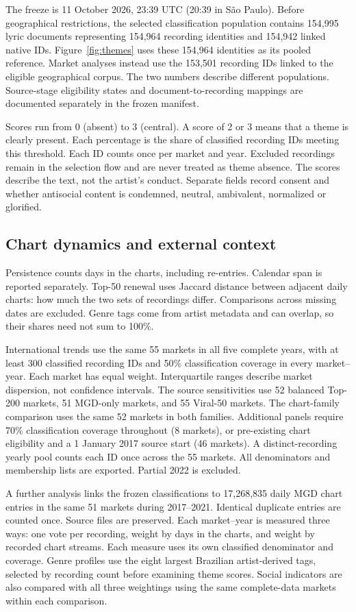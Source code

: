 \documentclass[10pt,a4paper,twocolumn]{article}
\begin{document}
The freeze is 11 October 2026, 23:39 UTC (20:39 in S\~ao Paulo). Before geographical restrictions, the selected classification population contains 154,995 lyric documents representing 154,964 recording identities and 154,942 linked native IDs. Figure~\ref{fig:themes} uses these 154,964 identities as its pooled reference. Market analyses instead use the 153,501 recording IDs linked to the eligible geographical corpus. The two numbers describe different populations. Source-stage eligibility states and document-to-recording mappings are documented separately in the frozen manifest.

Scores run from 0 (absent) to 3 (central). A score of 2 or 3 means that a theme is clearly present. Each percentage is the share of classified recording IDs meeting this threshold. Each ID counts once per market and year. Excluded recordings remain in the selection flow and are never treated as theme absence. The scores describe the text, not the artist's conduct. Separate fields record consent and whether antisocial content is condemned, neutral, ambivalent, normalized or glorified.

\subsection{Chart dynamics and external context}
Persistence counts days in the charts, including re-entries. Calendar span is reported separately. Top-50 renewal uses Jaccard distance between adjacent daily charts: how much the two sets of recordings differ. Comparisons across missing dates are excluded. Genre tags come from artist metadata and can overlap, so their shares need not sum to 100\%.

International trends use the same 55 markets in all five complete years, with at least 300 classified recording IDs and 50\% classification coverage in every market--year. Each market has equal weight. Interquartile ranges describe market dispersion, not confidence intervals. The source sensitivities use 52 balanced Top-200 markets, 51 MGD-only markets, and 55 Viral-50 markets. The chart-family comparison uses the same 52 markets in both families. Additional panels require 70\% classification coverage throughout (8 markets), or pre-existing chart eligibility and a 1 January 2017 source start (46 markets). A distinct-recording yearly pool counts each ID once across the 55 markets. All denominators and membership lists are exported. Partial 2022 is excluded.

A further analysis links the frozen classifications to 17,268,835 daily MGD chart entries in the same 51 markets during 2017--2021. Identical duplicate entries are counted once. Source files are preserved. Each market--year is measured three ways: one vote per recording, weight by days in the charts, and weight by recorded chart streams. Each measure uses its own classified denominator and coverage. Genre profiles use the eight largest Brazilian artist-derived tags, selected by recording count before examining theme scores. Social indicators are also compared with all three weightings using the same complete-data markets within each comparison.
\end{document}
